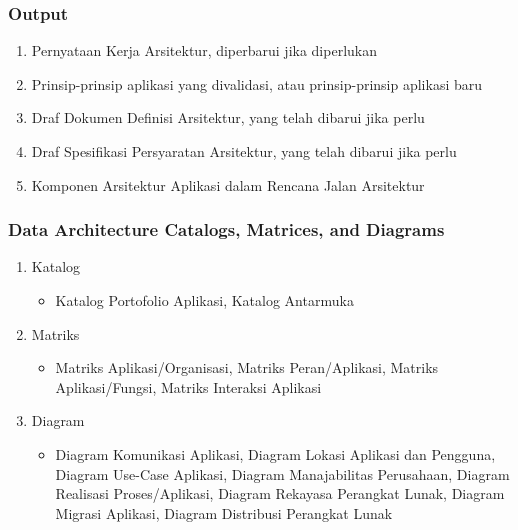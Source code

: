 \documentclass[aspectratio=169]{beamer}
\begin{document}
\begin{frame}
	\frametitle{Output}
	\begin{enumerate}
		\item Pernyataan Kerja Arsitektur, diperbarui jika diperlukan
		\item Prinsip-prinsip aplikasi yang divalidasi, atau prinsip-prinsip aplikasi baru
		\item Draf Dokumen Definisi Arsitektur, yang telah dibarui jika perlu
		\item Draf Spesifikasi Persyaratan Arsitektur, yang telah dibarui jika perlu
		\item Komponen Arsitektur Aplikasi dalam Rencana Jalan Arsitektur
	\end{enumerate}
\end{frame}



\begin{frame}
	\frametitle{ Data Architecture Catalogs, Matrices, and Diagrams}
	\begin{enumerate}
		\item Katalog
		\begin{itemize}
			\item Katalog Portofolio Aplikasi, Katalog Antarmuka
		\end{itemize}
		\item Matriks
		\begin{itemize}
			\item Matriks Aplikasi/Organisasi, Matriks Peran/Aplikasi, Matriks Aplikasi/Fungsi, Matriks Interaksi Aplikasi
		\end{itemize}
		\item Diagram
		\begin{itemize}
			\item Diagram Komunikasi Aplikasi, Diagram Lokasi Aplikasi dan Pengguna, Diagram Use-Case Aplikasi, Diagram Manajabilitas Perusahaan, Diagram Realisasi Proses/Aplikasi, Diagram Rekayasa Perangkat Lunak, Diagram Migrasi Aplikasi, Diagram Distribusi Perangkat Lunak
		\end{itemize}
	\end{enumerate}
\end{frame}
\end{document}
